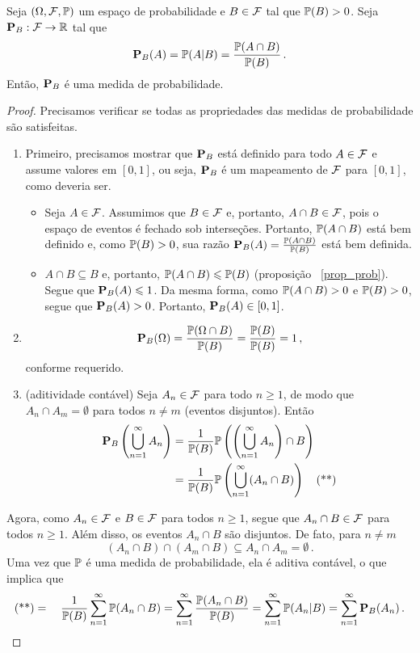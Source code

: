 \begin{proposition}
Seja $(\Omega,\mathcal F,\mathbb{P})$ um espaço de probabilidade e $B \in \mathcal F$ tal que $\mathbb{P}(B)>0$. Seja $\mathbf{P}_B: \mathcal F \rightarrow \mathbb{R}$ tal que
\begin{equation}
\mathbf{P}_B(A) = \mathbb{P}(A|B) = \frac{\mathbb{P}(A \cap B)}{\mathbb{P}(B)} \,.
\end{equation}
Então, $\mathbf{P}_B$ é uma medida de probabilidade.
\end{proposition}

\begin{proof}
Precisamos verificar se todas as propriedades das medidas de probabilidade são satisfeitas.
\begin{enumerate}
[$(i)$]
\item Primeiro, precisamos mostrar que $\mathbf{P}_B$ está definido para todo $A\in\mathcal F$ e assume valores em $[0,1]$, ou seja, $\mathbf{P}_B$ é um mapeamento de $\mathcal F$ para $[0,1]$, como deveria ser.
\begin{itemize}
    \item Seja $A\in\mathcal F$. Assumimos que $B\in\mathcal F$ e, portanto, $A\cap B\in\mathcal F$, pois o espaço de eventos é fechado sob interseções. Portanto, $\mathbb{P}(A\cap B)$ está bem definido e, como $\mathbb{P}(B)>0$, sua razão $\mathbf{P}_B(A) = \frac{\mathbb{P}(A\cap B)}{\mathbb{P}(B)}$ está bem definida.
    \item $A\cap B \subseteq B$ e, portanto, $\mathbb{P}(A\cap B)\leqslant \mathbb{P}(B)$ (proposição ~\ref{prop_prob}). Segue que $\mathbf{P}_B(A)\leqslant 1$. Da mesma forma, como $\mathbb{P}(A\cap B)>0$ e $\mathbb{P}(B)>0$, segue que $\mathbf{P}_B(A)>0$. Portanto, $\mathbf{P}_B(A)\in[0,1]$.
\end{itemize}
\item 
\begin{equation}
\mathbf{P}_B(\Omega) = \frac{\mathbb{P}(\Omega \cap B)}{\mathbb{P}(B)} = \frac{\mathbb{P}(B)}{\mathbb{P}(B)} = 1 \,,
\end{equation}
conforme requerido.
\item (aditividade contável) Seja $A_n\in \mathcal F$ para todo $n\geq 1$, de modo que
$A_n \cap A_m = \emptyset$ para todos $ n \neq m$ (eventos disjuntos). Então
\begin{align}
\mathbf{P}_B\left(\bigcup_{n=1}^{\infty} A_n\right) &= 
\frac{1}{\mathbb{P}(B)} \mathbb{P}\left(\left(\bigcup_{n=1}^{\infty} A_n \right) \cap B \right) \\
&=\frac{1}{\mathbb{P}(B)} \mathbb{P}\left(\bigcup_{n=1}^{\infty} (A_n \cap B) \right) \quad \text{(**)}
\end{align}
\end{enumerate}
Agora, como $A_n\in\mathcal F$ e $B\in\mathcal F$ para todos $n\geq 1$, segue que $A_n \cap B\in \mathcal F$ para todos $n\geq 1$. Além disso, os eventos $A_n\cap B$ são disjuntos.  De fato, para $n \neq m$
\begin{equation}
(A_n \cap B) \cap (A_m \cap B) \subseteq A_n \cap A_m = \emptyset \,.
\end{equation}
Uma vez que $\mathbb{P}$ é uma medida de probabilidade, ela é aditiva contável, o que implica que
\begin{equation}
\text{(**)} = \quad \frac{1}{\mathbb{P}(B)} \sum_{n=1}^{\infty} \mathbb{P}(A_n \cap B) =
\sum_{n=1}^{\infty}\frac{\mathbb{P}(A_n \cap B)}{\mathbb{P}(B)}
= \sum_{n=1}^{\infty} \mathbb{P}(A_n|B) = \sum_{n=1}^{\infty} \mathbf{P}_{B}(A_n) \,.
\end{equation}
\end{proof}

